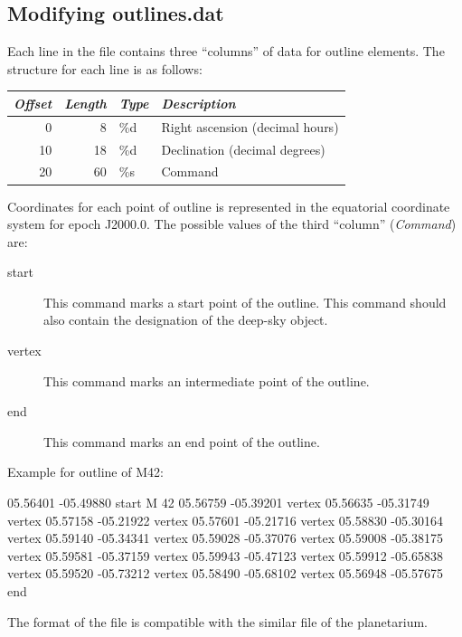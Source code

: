 \subsection{Modifying outlines.dat}
\label{sec:dso:modifyingOutlines}

\noindent{}Each line in the file  contains three ``columns'' of data for outline elements. The structure for each line is as follows:

\noindent%
\begin{tabularx}{\textwidth}{r|r|l|X}
\toprule
\emph{Offset} & \emph{Length} & \emph{Type} & \emph{Description}\\
\midrule
0  &  8 & \%d  & Right ascension (decimal hours)\\
10 & 18 & \%d  & Declination (decimal degrees)\\
20 & 60 & \%s  & Command\\
\bottomrule
\end{tabularx}

\noindent Coordinates for each point of outline is represented in the equatorial coordinate system for epoch J2000.0. 
The possible values of the third ``column'' (\emph{Command}) are:
\begin{description}
\item[start] This command marks a start point of the outline. This command should also contain the designation of the deep-sky object.
\item[vertex] This command marks an intermediate point of the outline.
\item[end] This command marks an end point of the outline.
\end{description}


Example for outline of M42:
\begin{configfile}
05.56401 -05.49880 start  M 42 
05.56759 -05.39201 vertex 
05.56635 -05.31749 vertex 
05.57158 -05.21922 vertex 
05.57601 -05.21716 vertex 
05.58830 -05.30164 vertex 
05.59140 -05.34341 vertex 
05.59028 -05.37076 vertex 
05.59008 -05.38175 vertex 
05.59581 -05.37159 vertex 
05.59943 -05.47123 vertex 
05.59912 -05.65838 vertex 
05.59520 -05.73212 vertex 
05.58490 -05.68102 vertex 
05.56948 -05.57675 end
\end{configfile}

The format of the file  is compatible with the similar file of the  planetarium.

\newpage
